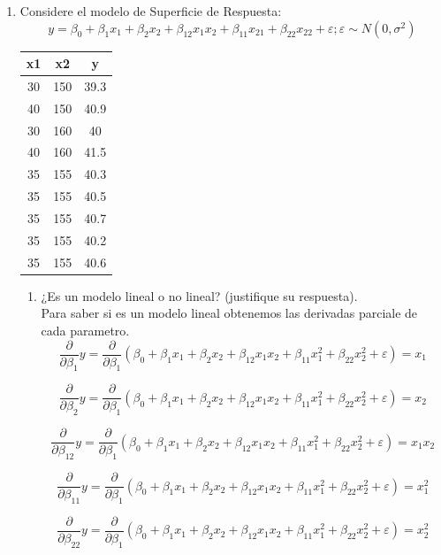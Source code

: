 \documentclass[12pt,a4paper]{report}
\begin{document}
\begin{enumerate}
\item Considere el modelo de Superficie de Respuesta:
$$y = \beta_{0} + \beta_{1} x_{1} + \beta_{2} x_{2} + \beta_{12} x_{1}x_{2} + \beta_{11} x_{21} + \beta_{22} x_{22} + \varepsilon; \varepsilon \sim N(0, \sigma^2)$$

\begin{tabular}{| c | c | c |}
\hline
x1 & x2 & y\\ \hline
30 &150 &39.3\\
40 &150 &40.9\\
30 &160 &40\\
40 &160 &41.5\\
35 &155 &40.3\\
35 &155 &40.5\\
35 &155 &40.7\\
35 &155 &40.2\\
35 &155 &40.6\\
\hline
\end{tabular}

\begin{enumerate}
\item ¿Es un modelo lineal o no lineal? (justifique su respuesta).\\

Para saber si es un  modelo lineal obtenemos las derivadas parciale de cada parametro.\\
$$\dfrac{\partial}{\partial\beta_{1}}y=\dfrac{\partial}{\partial\beta_{1}}\left(\beta_{0} + \beta_{1} x_{1} + \beta_{2} x_{2} + \beta_{12} x_{1}x_{2} + \beta_{11} x_{1}^{2} + \beta_{22} x_{2}^{2} + \varepsilon\right)=x_{1}$$

$$\dfrac{\partial}{\partial\beta_{2}}y=\dfrac{\partial}{\partial\beta_{1}}\left(\beta_{0} + \beta_{1} x_{1} + \beta_{2} x_{2} + \beta_{12} x_{1}x_{2} + \beta_{11} x_{1}^{2} + \beta_{22} x_{2}^{2} + \varepsilon\right)=x_{2}$$

$$\dfrac{\partial}{\partial\beta_{12}}y=\dfrac{\partial}{\partial\beta_{1}}\left(\beta_{0} + \beta_{1} x_{1} + \beta_{2} x_{2} + \beta_{12} x_{1}x_{2} + \beta_{11} x_{1}^{2} + \beta_{22} x_{2}^{2} + \varepsilon\right)=x_{1}x_{2}$$

$$\dfrac{\partial}{\partial\beta_{11}}y=\dfrac{\partial}{\partial\beta_{1}}\left(\beta_{0} + \beta_{1} x_{1} + \beta_{2} x_{2} + \beta_{12} x_{1}x_{2} + \beta_{11} x_{1}^{2} + \beta_{22} x_{2}^{2} + \varepsilon\right)=x_{1}^{2}$$

$$\dfrac{\partial}{\partial\beta_{22}}y=\dfrac{\partial}{\partial\beta_{1}}\left(\beta_{0} + \beta_{1} x_{1} + \beta_{2} x_{2} + \beta_{12} x_{1}x_{2} + \beta_{11} x_{1}^{2} + \beta_{22} x_{2}^{2} + \varepsilon\right)=x_{2}^{2}$$


\end{enumerate}
\end{enumerate}
\end{document}
